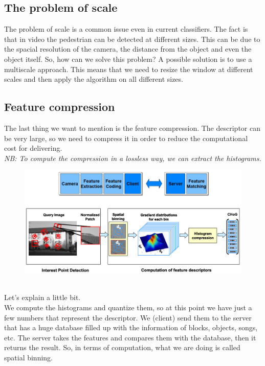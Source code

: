 \subsection{The problem of scale}
The problem of scale is a common issue even in current classifiers. The fact is that in video the pedestrian can be detected at different sizes.
This can be due to the spacial resolution of the camera, the distance from the object and even the object itself.
So, how can we solve this problem? A possible solution is to use a multiscale approach. This means that we need to resize the window at different scales and then apply the algorithm on all different sizes.
\subsection{Feature compression}
The last thing we want to mention is the feature compression. The descriptor can be very large, so we need to compress it in order to reduce the computational cost for delivering.
\\\textit{NB: To compute the compression in a lossless way, we can extract the histograms.}
\begin{figure}[h]
    \centering
    \includegraphics[scale=0.5]{Figures/FeatureCompression.png}
\end{figure}
\\Let's explain a little bit.
\\We compute the histograms and quantize them, so at this point we have just a few numbers that represent the descriptor. 
We (client) send them to the server that has a huge database filled up with the information of blocks, objects, songs, etc.
The server takes the features and compares them with the database, then it returns the result.
So, in terms of computation, what we are doing is called spatial binning.
